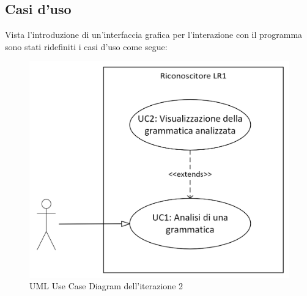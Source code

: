 \documentclass[12pt]{article}
\begin{document}
\pagebreak
\subsection{Casi d'uso}
Vista l'introduzione di un'interfaccia grafica per l'interazione con il programma sono stati ridefiniti i casi d'uso come segue:
\begin{figure}[h]
\centering
\includegraphics[scale=1]{immagini/UC_v2.png}
\caption{UML Use Case Diagram dell'iterazione 2}
\end{figure}
\end{document}
